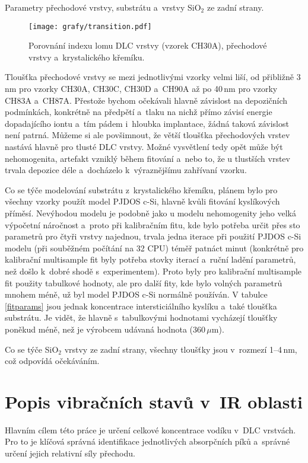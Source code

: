 \begin{table}[htbp]
 \centering
	\renewcommand{\tabcolsep}{4pt}
 
 \caption{Parametry přechodové vrstvy, substrátu a~vrstvy SiO$_2$ ze zadní strany.}
\label{tsb-params}
\end{table}

\begin{figure}[htbp]
	\texttt{[image: grafy/transition.pdf]}
	\caption{Porovnání indexu lomu DLC vrstvy (vzorek CH30A), přechodové vrstvy a~krystalického křemíku.} 
	\label{transition}
\end{figure}

Tloušťka přechodové vrstvy se mezi jednotlivými vzorky velmi liší, od přibližně 3\,nm pro vzorky CH30A, CH30C, CH30D a~CH90A až po 40\,nm pro vzorky CH83A a~CH87A. Přestože bychom očekávali hlavně závislost na depozičních podmínkách, konkrétně na předpětí a~tlaku na nichž přímo závisí energie dopadajícího iontu a~tím pádem i~hloubka implantace, žádná taková závislost není patrná. 
Můžeme si ale povšimnout, že větší tloušťka přechodových vrstev nastává hlavně pro tlusté DLC vrstvy. Možné vysvětlení tedy opět může být nehomogenita, artefakt vzniklý během fitování a~nebo to, že u tlustších vrstev trvala depozice déle a~docházelo k~výraznějšímu zahřívaní vzorku.

Co se týče modelování substrátu z~krystalického křemíku, plánem bylo pro všechny vzorky použít model PJDOS c-Si, hlavně kvůli fitování kyslíkových příměsí. 
Nevýhodou modelu je podobně jako u modelu nehomogenity jeho velká výpočetní náročnost a~proto při kalibračním fitu, kde bylo potřeba určit přes sto parametrů pro čtyři vrstvy najednou, trvala jedna iterace při použití PJDOS c-Si modelu (při souběžném počítání na 32 CPU) téměř patnáct minut (konkrétně pro kalibrační multisample fit byly potřeba stovky iterací a~ruční ladění parametrů, než došlo k~dobré shodě s~experimentem). 
Proto byly pro kalibrační multisample fit použity tabulkové hodnoty, ale pro další fity, kde bylo volných parametrů mnohem méně, už byl model 
PJDOS c-Si normálně používán. V tabulce \ref{fitparams} jsou jednak koncentrace intersticiálního kyslíku a~také tloušťka substrátu. Je vidět, že hlavně s~ta\-bul\-ko\-vými hodnotami vycházejí tloušťky poněkud méně, než je výrobcem udávaná hodnota (360\,$\mu$m).

Co se týče SiO$_2$ vrstvy ze zadní strany, všechny tloušťky jsou v~rozmezí 1--4\,nm, což odpovídá očekáváním.


\section{Popis vibračních stavů v~IR oblasti}
Hlavním cílem této práce je určení celkové koncentrace vodíku v~DLC vrstvách. Pro to je klíčová správná identifikace jednotlivých absorpčních píků a~správné určení jejich relativní síly přechodu.

